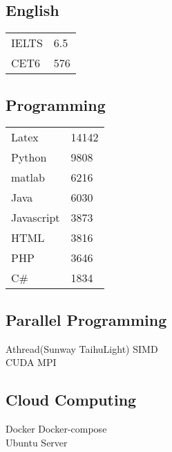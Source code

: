 \documentclass[]{deedy-resume-openfont}
\begin{document}
\begin{minipage}[t]{0.25\textwidth}
\subsection{English}
\begin{tabular}{ll}
    IELTS & 6.5 \\
    CET6  & 576 \\
\end{tabular}
\sectionsep
\subsection{Programming }
\begin{tabular}{ll}
    Latex      & 14142  \\
    Python     & 9808  \\
    matlab     & 6216  \\
    Java       & 6030  \\
    Javascript & 3873  \\
    HTML       & 3816  \\
    PHP        & 3646  \\
    C\#        & 1834  \\
\end{tabular}
\sectionsep

\subsection{Parallel Programming}
Athread(Sunway TaihuLight) \textbullet{} SIMD \\
CUDA \textbullet{} MPI \\
\sectionsep

\subsection{Cloud Computing}
Docker \textbullet{} Docker-compose \\
Ubuntu Server \\

\end{minipage} 
\hfill
\end{document}
